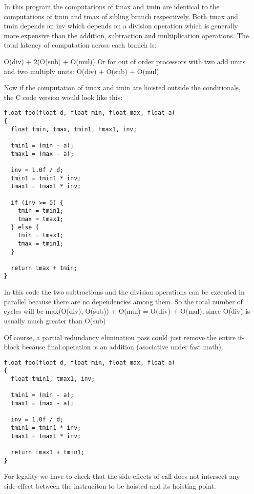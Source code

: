 \documentclass{sig-alternate}
\begin{document}
In this program the computations of tmax and tmin are identical to the
computations of tmin and tmax of sibling branch respectively. Both tmax and tmin
depends on inv which depends on a division operation which is generally more
expensive than the addition, subtraction and multiplication operations. The
total latency of computation across each branch is:

O(div) + 2(O(sub) + O(mul))
Or for out of order processors with two add units and two multiply units:
O(div) + O(sub) + O(mul)

Now if the computation of tmax and tmin are hoisted outside the
conditionals, the C code version would look like this:
\begin{verbatim}
float foo(float d, float min, float max, float a)
{
  float tmin, tmax, tmin1, tmax1, inv;

  tmin1 = (min - a);
  tmax1 = (max - a);

  inv = 1.0f / d;
  tmin1 = tmin1 * inv;
  tmax1 = tmax1 * inv;

  if (inv >= 0) {
    tmin = tmin1;
    tmax = tmax1;
  } else {
    tmin = tmax1;
    tmax = tmin1;
  }

  return tmax + tmin;
}

\end{verbatim}

In this code the two subtractions and the division operations can be executed in
parallel because there are no dependencies among them. So the total number of
cycles will be max(O(div), O(sub)) + O(mul) = O(div) + O(mul); since O(div) is
usually much greater than O(sub) \cite{x86,aarch64}

Of course, a partial redundancy elimination pass could just remove the entire
if-block because final operation is an addition (asociative under fast math).

\begin{verbatim}
float foo(float d, float min, float max, float a)
{
  float tmin1, tmax1, inv;

  tmin1 = (min - a);
  tmax1 = (max - a);

  inv = 1.0f / d;
  tmin1 = tmin1 * inv;
  tmax1 = tmax1 * inv;

  return tmax1 + tmin1;
}
\end{verbatim}

For legality we have to check that the side-effects of call does not intersect
any side-effect between the instruciton to be hoisted and its hoisting point.
\end{document}
